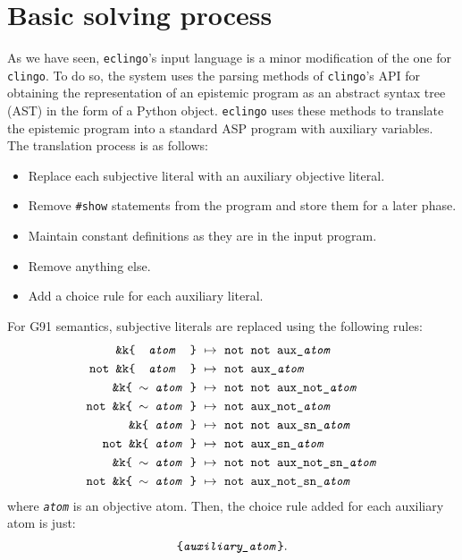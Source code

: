 \documentclass{new_tlp}
\let\sneg\relax
\newcommand{\sneg}{\ensuremath{\text{-}}}
\def\eclingo{{\tt eclingo}}
\def\clingo{{\tt clingo}}
\begin{document}
\section{Basic solving process}
\label{sec:impl}
As we have seen, \eclingo's input language is a minor modification of the one for \clingo{}.
To do so, the system uses the  parsing methods of \clingo's API for obtaining the representation of an epistemic program as an abstract syntax tree (AST)
in the form of a Python object.
\eclingo{} uses these methods to translate the epistemic program into a standard ASP program with auxiliary variables.
The translation process is as follows:
\begin{itemize}
    \item Replace each subjective literal with an auxiliary objective literal.
    \item Remove {\tt \#show} statements from the program and store them for a later phase.
    \item Maintain constant definitions as they are in the input program.
    \item Remove anything else.
    \item Add a choice rule for each auxiliary literal.
\end{itemize}

For G91 semantics, subjective literals are replaced using the following rules:
\begin{align}
    \texttt{\&k\{ \ \emph{atom} \ \}} \ & \mapsto\ \texttt{not\ not\ aux\_\emph{atom}} \label{r:g91_1} \\
    \texttt{not\ \&k\{ \ \emph{atom} \ \}} \ & \mapsto\ \texttt{not\ aux\_\emph{atom}} \label{r:g91_2} \\
    \texttt{\&k\{\ $\sim$ \emph{atom}\  \}}\ & \mapsto\ \texttt{not\ not\ aux\_not\_\emph{atom}} \\
    \texttt{not\ \&k\{\ $\sim$ \emph{atom}\  \}}\ & \mapsto\ \texttt{not\ aux\_not\_\emph{atom}} \\
    \texttt{\&k\{\ \sneg\emph{atom}\  \}}\ & \mapsto\ \texttt{not\ not\ aux\_sn\_\emph{atom}} \\
    \texttt{not\ \&k\{\ \sneg\emph{atom}\  \}}\ & \mapsto\ \texttt{not\ aux\_sn\_\emph{atom}} \\
    \texttt{\&k\{\ $\sim$ \sneg\emph{atom}\  \}}\ & \mapsto\ \texttt{not\ not\ aux\_not\_sn\_\emph{atom}} \\
    \texttt{not\ \&k\{\ $\sim$ \sneg\emph{atom}\  \}}\ & \mapsto\ \texttt{not\ aux\_not\_sn\_\emph{atom}} \label{r:g91_8}
\end{align}
where \texttt{\emph{atom}} is an objective atom.
%
Then, the choice rule added for each auxiliary atom is just:
\begin{align*}
    \texttt{\{\emph{auxiliary\_atom}\}}.
\end{align*}
\end{document}
